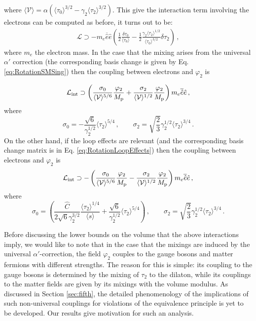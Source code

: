 \documentclass[11pt,a4paper]{article}
\newcommand{\V}{\mathcal{V}}
\begin{document}
where $\langle \V \rangle = \alpha \left(\langle \tau_0 \rangle^{3/2} - \gamma_2 \langle \tau_2 \rangle^{3/2} \right)$.  This give the interaction term involving the electrons can be computed as
before, it turns out to be:
\begin{align}
\label{eq:CouplingElectronSing}
\mathcal{L} \supset - m_e \overline{\hat{e}} \hat{e} \left(\frac{1}{2} \frac{\delta \tau_0}{\langle \tau_0 \rangle} - \frac{1}{2} \frac{\gamma_2 \langle \tau_2 \rangle^{1/2}}{\langle \tau_0 \rangle^{3/2}} \delta \tau_2\right) \,,
\end{align}
where $m_e$ the electron mass. In the case that the mixing arises from the universal $\alpha'$ correction (the corresponding basis change is given by Eq. \eqref{eq:RotationSMSing}) then the coupling between electrons and $\varphi_2$ is

\begin{equation}
\mathcal{L}_{\rm int} \supset \left(\frac{\sigma_0}{\langle \V \rangle^{5/6}} \frac{\varphi_2}{M_{\rm p}} + \frac{\sigma_2}{\langle \V \rangle^{1/2}} \frac{\varphi_2}{M_{\rm p}} \right) m_e \overline{\hat{e}} \hat{e} \,,
\end{equation}
where
%
\begin{equation}
\sigma_0 = -\frac{\sqrt{6}}{\gamma_2^{1/2}}  \langle \tau_2 \rangle^{5/4} \,, \qquad \sigma_2 = \sqrt{\frac{2}{3}} \gamma_2^{1/2} \langle \tau_2 \rangle^{3/4} \,.
\end{equation}
%
On the other hand, if the loop effects are relevant (and the corresponding basis change matrix is in Eq. \eqref{eq:RotationLoopEffects}) then the coupling between electrons
and $\varphi_2$ is
\begin{equation}
\mathcal{L}_{\rm int} \supset - \left(\frac{\sigma_0}{\langle \V \rangle^{5/6}} \frac{\varphi_2}{M_{\rm p}} - \frac{\sigma_2}{\langle \V \rangle^{1/2}} \frac{\varphi_2}{M_{\rm p}} \right) m_e \overline{\hat{e}} \hat{e} \,,
\end{equation}
where
%
\begin{equation}
\sigma_0 = \left(\frac{\hat{C}}{2 \sqrt{6} \gamma_2^{3/2}} \frac{\langle\tau_2\rangle^{1/4}}{\langle s \rangle} + \frac{\sqrt{6}}{\gamma_2^{1/2}} \langle\tau_2\rangle^{5/4}\right) \,, \qquad \sigma_2 = \sqrt{\frac{2}{3}} \gamma_2^{1/2} \langle \tau_2 \rangle^{3/4} \,.
\end{equation}
%

Before discussing the lower bounds on the volume that the above interactions imply, we would like to note that in the case that the mixings are induced by the universal $\alpha'$-correction, the field $\varphi_2$ couples to the gauge bosons and matter fermions with different strengths. The reason for this is simple: its coupling to the gauge bosons is determined by the mixing of $\tau_2$ to the dilaton, while its couplings to the matter fields are given by its mixings with the volume modulus. As discussed in Section \ref{sec:fifth}, the detailed phenomenology of the implications of such non-universal couplings for violations of the equivalence principle is yet to be developed. Our results give motivation for such an analysis.
\end{document}
